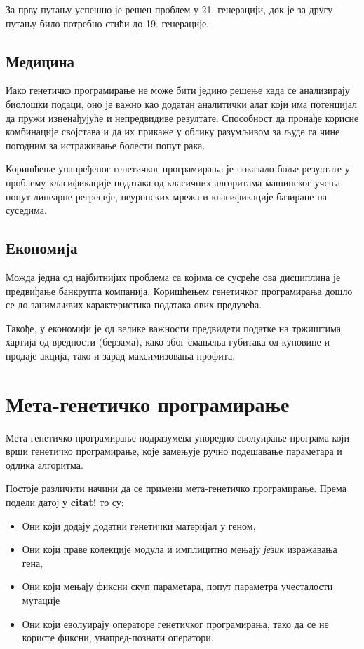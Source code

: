 \documentclass[a4paper]{article}
\begin{document}
За прву путању успешно је решен проблем у 21. генерацији, док је за другу путању било потребно стићи до 19. генерације. \cite{robo2} 
\subsection{Медицина}
Иако генетичко програмирање не може бити једино решење када се анализирају биолошки подаци, оно је важно као додатан аналитички алат који има потенцијал да пружи изненађујуће и непредвидиве резултате. Способност да пронађе корисне комбинације својстава и да их прикаже у облику разумљивом за људе га чине погодним за истраживање болести попут рака. \cite{cancer}

Коришћење унапређеног генетичког програмирања је показало боље резултате у проблему класификације података од класичних алгоритама машинског учења попут линеарне регресије, неуронских мрежа и класификације базиране на суседима. \cite{egp}
\subsection{Економија}
Можда једна од најбитнијих проблема са којима се сусреће ова дисциплина је предвиђање банкрупта компанија. Коришћењем генетичког програмирања дошло се до занимљивих карактеристика података ових предузећа. \cite{bankruptcy}

Такође, у економији је од велике важности предвидети податке на тржиштима хартија од вредности (берзама), како због смањења губитака од куповине и продаје акција, тако и зарад максимизовања профита. \cite{stock}

\section{Мета-генетичко програмирање}

Мета-генетичко програмирање подразумева упоредно еволуирање програма који врши генетичко програмирање, које замењује ручно подешавање параметара и одлика алгоритма.
\newline

Постоје различити начини да се примени мета-генетичко програмирање. Према подели датој у \textbf{citat!} то су:

\begin{itemize}
	\item Они који додају додатни генетички материјал у геном,
	\item Они који праве колекције модула и имплицитно мењају \emph{језик} изражавања гена,
	\item Они који мењају фиксни скуп параметара, попут параметра учесталости мутације
	\item Они који еволуирају операторе генетичког програмирања, тако да се не користе фиксни, унапред-познати оператори.
\end{itemize}
\end{document}
